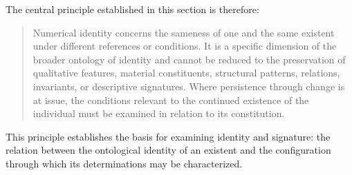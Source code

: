 The central principle established
in this section is therefore:

\begin{quote}
Numerical identity concerns the
sameness of one and the same existent
under different references or conditions.
It is a specific dimension of the
broader ontology of identity and
cannot be reduced to the preservation
of qualitative features, material
constituents, structural patterns,
relations, invariants, or descriptive
signatures. Where persistence through
change is at issue, the conditions
relevant to the continued existence
of the individual must be examined
in relation to its constitution.
\end{quote}

This principle establishes the basis
for examining identity and signature:
the relation between the ontological
identity of an existent and the
configuration through which its
determinations may be characterized.

